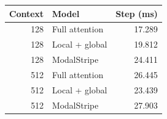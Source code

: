 \begin{tabular}{rlr}\toprule
Context & Model & Step (ms)\\\midrule
128 & Full attention & 17.289 \\
128 & Local + global & 19.812 \\
128 & ModalStripe & 24.411 \\
512 & Full attention & 26.445 \\
512 & Local + global & 23.439 \\
512 & ModalStripe & 27.903 \\
\bottomrule\end{tabular}
